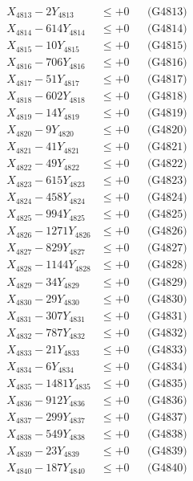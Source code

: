 \documentclass[a4paper,10pt]{article}
\begin{document}
{\begin{align}
X_{4813} - 2Y_{4813} &\leq +0 && \text{(G4813)} \\
X_{4814} - 614Y_{4814} &\leq +0 && \text{(G4814)} \\
X_{4815} - 10Y_{4815} &\leq +0 && \text{(G4815)} \\
X_{4816} - 706Y_{4816} &\leq +0 && \text{(G4816)} \\
X_{4817} - 51Y_{4817} &\leq +0 && \text{(G4817)} \\
X_{4818} - 602Y_{4818} &\leq +0 && \text{(G4818)} \\
X_{4819} - 14Y_{4819} &\leq +0 && \text{(G4819)} \\
X_{4820} - 9Y_{4820} &\leq +0 && \text{(G4820)} \\
\allowbreak
X_{4821} - 41Y_{4821} &\leq +0 && \text{(G4821)} \\
X_{4822} - 49Y_{4822} &\leq +0 && \text{(G4822)} \\
X_{4823} - 615Y_{4823} &\leq +0 && \text{(G4823)} \\
X_{4824} - 458Y_{4824} &\leq +0 && \text{(G4824)} \\
X_{4825} - 994Y_{4825} &\leq +0 && \text{(G4825)} \\
X_{4826} - 1271Y_{4826} &\leq +0 && \text{(G4826)} \\
X_{4827} - 829Y_{4827} &\leq +0 && \text{(G4827)} \\
X_{4828} - 1144Y_{4828} &\leq +0 && \text{(G4828)} \\
X_{4829} - 34Y_{4829} &\leq +0 && \text{(G4829)} \\
X_{4830} - 29Y_{4830} &\leq +0 && \text{(G4830)} \\
\allowbreak
X_{4831} - 307Y_{4831} &\leq +0 && \text{(G4831)} \\
X_{4832} - 787Y_{4832} &\leq +0 && \text{(G4832)} \\
X_{4833} - 21Y_{4833} &\leq +0 && \text{(G4833)} \\
X_{4834} - 6Y_{4834} &\leq +0 && \text{(G4834)} \\
X_{4835} - 1481Y_{4835} &\leq +0 && \text{(G4835)} \\
X_{4836} - 912Y_{4836} &\leq +0 && \text{(G4836)} \\
X_{4837} - 299Y_{4837} &\leq +0 && \text{(G4837)} \\
X_{4838} - 549Y_{4838} &\leq +0 && \text{(G4838)} \\
X_{4839} - 23Y_{4839} &\leq +0 && \text{(G4839)} \\
X_{4840} - 187Y_{4840} &\leq +0 && \text{(G4840)} \\

\end{align}}
\end{document}
